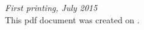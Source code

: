 \documentclass[11pt,fleqn]{book} %
\begin{document}
\noindent \textit{First printing, July 2015} \\%

\noindent This pdf document was created on \textit{\pdfcreationdate}.



\pagestyle{empty} %


\tableofcontents %
\listoftables
\listoffigures
\lstlistoflistings

\cleardoublepage %

\pagestyle{fancy} %






%
%
%
%
%

\cleardoublepage
{}
\setlength{\columnsep}{0.75cm}
\printindex

\end{document}
